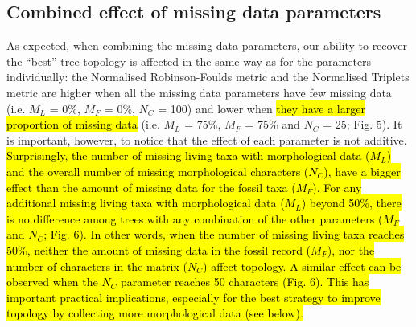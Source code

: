 \documentclass[12pt,letterpaper]{article}
\begin{document}
\subsection{Combined effect of missing data parameters}
As expected, when combining the missing data parameters, our ability to recover the ``best'' tree topology is affected in the same way as for the parameters individually: the Normalised Robinson-Foulds metric and the Normalised Triplets metric are higher when all the missing data parameters have few missing data (i.e. $M_{L}$ = 0\%, $M_{F}$ = 0\%, $N_{C}$ = 100) and lower when \hl{they have a larger proportion of missing data} (i.e. $M_{L}$ = 75\%, $M_{F}$ = 75\% and $N_{C}$ = 25; Fig. 5).
It is important, however, to notice that the effect of each parameter is not additive.
\hl{Surprisingly, the number of missing living taxa with morphological data ($M_{L}$) and the overall number of missing morphological characters ($N_{C}$), have a bigger effect than the amount of missing data for the fossil taxa ($M_{F}$).
For any additional missing living taxa with morphological data ($M_L$) beyond 50\%, there is no difference among trees with any combination of the other parameters ($M_F$ and $N_C$; Fig. 6).
In other words, when the number of missing living taxa reaches 50\%, neither the amount of missing data in the fossil record ($M_F$), nor the number of characters in the matrix ($N_C$) affect topology.
A similar effect can be observed when the $N_C$ parameter reaches 50 characters (Fig. 6).
This has important practical implications, especially for the best strategy to improve topology by collecting more morphological data (see below).}
\end{document}
